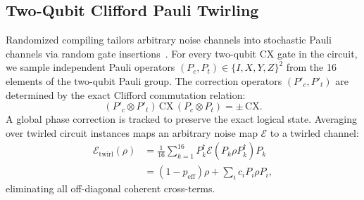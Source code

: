 \documentclass[10pt,twocolumn,a4paper]{article}
\begin{document}
\subsection{Two-Qubit Clifford Pauli Twirling}
Randomized compiling tailors arbitrary noise channels into stochastic Pauli channels via random gate insertions~\cite{wallman2016}. For every two-qubit $\mathrm{CX}$ gate in the circuit, we sample independent Pauli operators $(P_c, P_t) \in \{I, X, Y, Z\}^2$ from the 16 elements of the two-qubit Pauli group. The correction operators $(P'_c, P'_t)$ are determined by the exact Clifford commutation relation:
\begin{equation}
(P'_c \otimes P'_t)\,\mathrm{CX}\,(P_c \otimes P_t) = \pm\,\mathrm{CX}.
\label{eq:pauli_twirl}
\end{equation}
A global phase correction is tracked to preserve the exact logical state. Averaging over twirled circuit instances maps an arbitrary noise map $\mathcal{E}$ to a twirled channel:
\begin{align}
\mathcal{E}_{\mathrm{twirl}}(\rho) &= \frac{1}{16} \sum_{k=1}^{16} P_k^\dagger \mathcal{E}(P_k \rho P_k^\dagger) P_k \nonumber \\
&= (1-p_{\mathrm{eff}})\rho + \sum_{i} c_i P_i \rho P_i,
\end{align}
eliminating all off-diagonal coherent cross-terms.
\end{document}
